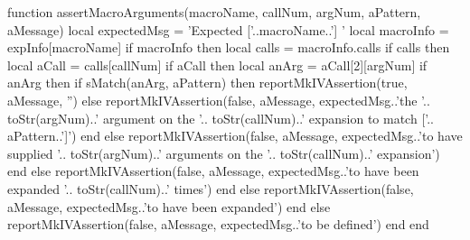 \startConTest
\begingroup
  \aTexMockZeroArgs
  \startAssertShouldFail{}{}{}
  \stopAssertShouldFail
\endgroup
\stopConTest

\stopTestCase

\startConTest
\begingroup
  \startAssertShouldFail{}{}{}
  \stopAssertShouldFail
  \aContextMock
  \startAssertShouldFail{}{}{}
  \stopAssertShouldFail
  \startAssertShouldFail{}{}{}
  \stopAssertShouldFail
\endgroup
\stopConTest
\stopTestCase

\stopTestSuite

\startTestSuite[assertMacroNthArgumentOnMthExpansionMatches]

\startMkIVCode
\def\assertMacroNthArgumentOnMthExpansionMatches#1#2#3#4#5{%
  \directlua{%
    thirddata.contests.assertMacroArguments(
      '#1', #3, #2, '#4', '#5'
    )
  }
}
\stopMkIVCode

\startLuaCode
function assertMacroArguments(macroName,
                              callNum,
                              argNum,
                              aPattern,
                              aMessage)
  local expectedMsg = 'Expected ['..macroName..'] '
  local macroInfo = expInfo[macroName]
  if macroInfo then
    local calls = macroInfo.calls
    if calls then
      local aCall = calls[callNum]
      if aCall then
        local anArg = aCall[2][argNum]
        if anArg then
          if sMatch(anArg, aPattern) then
            reportMkIVAssertion(true, aMessage, '')
          else
            reportMkIVAssertion(false, aMessage,
              expectedMsg..'the '..
              toStr(argNum)..' argument on the '..
              toStr(callNum)..' expansion to match ['..
              aPattern..']')
          end
        else
          reportMkIVAssertion(false, aMessage,
            expectedMsg..'to have supplied '..
            toStr(argNum)..' arguments on the '..
            toStr(callNum)..' expansion')
        end
      else
        reportMkIVAssertion(false, aMessage,
          expectedMsg..'to have been expanded '..
          toStr(callNum)..' times')
      end
    else
      reportMkIVAssertion(false, aMessage,
        expectedMsg..'to have been expanded')
    end
  else
    reportMkIVAssertion(false, aMessage,
      expectedMsg..'to be defined')
  end
end

